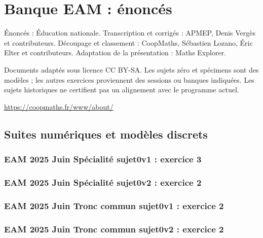 \documentclass[lang=fr,edition=teacher,layout=sheet]{mxbook}
\begin{document}
\chapter*{Banque EAM : énoncés}
Énoncés : Éducation nationale. Transcription et corrigés : APMEP, Denis Vergès et contributeurs. Découpage et classement : CoopMaths, Sébastien Lozano, Éric Elter et contributeurs. Adaptation de la présentation : Maths Explorer.\par\medskip
\noindent Documents adaptés sous licence CC BY-SA. Les sujets zéro et spécimens sont des modèles ; les autres exercices proviennent des sessions ou banques indiquées. Les sujets historiques ne certifient pas un alignement avec le programme actuel.
\par\smallskip\url{https://coopmaths.fr/www/about/}
\clearpage\section*{Suites numériques et modèles discrets}
\subsection*{EAM 2025 Juin Spécialité sujet0v1 : exercice 3}
\begingroup\endgroup
\par\bigskip
{}\subsection*{EAM 2025 Juin Spécialité sujet0v2 : exercice 2}
\begingroup\endgroup
\par\bigskip
{}\subsection*{EAM 2025 Juin Tronc commun sujet0v1 : exercice 2}
\begingroup\endgroup
\par\bigskip
{}\subsection*{EAM 2025 Juin Tronc commun sujet0v2 : exercice 2}
\begingroup\endgroup
\end{document}
